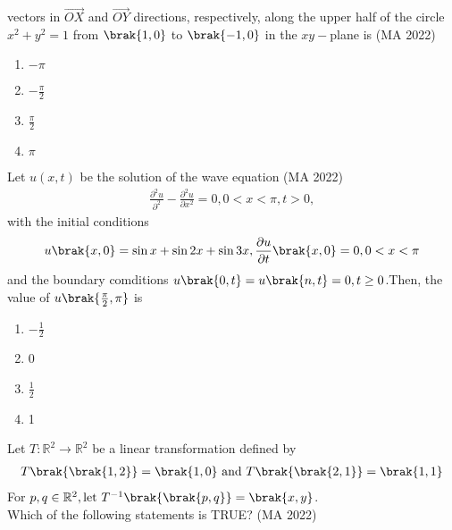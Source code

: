 vectors in $\vec{OX}$ and $\vec{OY}$ directions, respectively, along the upper half of the circle $x^2+y^2=1$ from $\brak{1,0}$ to $\brak{-1,0}$ in the $xy-$plane is
\hfill{(MA 2022)}
\begin{multicols}{4}
\begin{enumerate}
\item $-\pi $
\item $-\frac{\pi}{2}$
\item $\frac{\pi}{2}$
\item $\pi$
\end{enumerate} 
\end{multicols}
\item Let $u(x, t)$ be the solution of the wave equation
\hfill{(MA 2022)}
\begin{align}
\frac{\partial^2u}{\partial^2} - \frac{\partial^2u}{\partial x^2} = 0,0<x<\pi,t>0, 
\end{align}
with the initial conditions
\begin{align}
u\brak{x,0} = \sin{x}+\sin{2x}+\sin{3x},\frac{\partial u}{\partial t}\brak{x,0} = 0, 0<x<\pi
\end{align}
and the boundary comditions $u\brak{0, t} = u\brak{n, t} = 0, t \geq 0$.Then, the value of $u\brak{\frac{\pi}{2},\pi}$ is
\begin{multicols}{4}
\begin{enumerate}
\item $-\frac{1}{2}$
\item 0
\item $\frac{1}{2}$
\item 1
\end{enumerate}
\end{multicols}
\item Let $T : \mathbb{R}^2 \rightarrow \mathbb{R}^2$ be a linear transformation defined by
\begin{align}
T\brak{\brak{1,2}}=\brak{1,0} \text{ and } T\brak{\brak{2,1}}=\brak{1,1}
\end{align}
For $p,q \in \mathbb{R}^2,\text{let } T^{-1}\brak{\brak{p,q}}=\brak{x,y}$.\\
Which of the following statements is TRUE?
\hfill{(MA 2022)}

